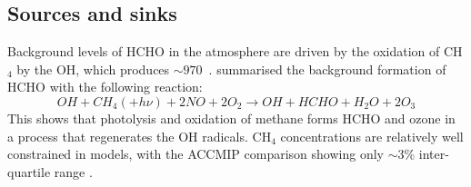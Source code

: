   
  \subsection{Sources and sinks}
    \label{LR:HCHO:Sources}
     
    Background levels of HCHO in the atmosphere are driven by the oxidation of CH$_4$ by the OH$\dot{}$, which produces $\sim 970$\tgpyr ~\parencite{FortemsCheiney2012}.
    \textcite{Atkinson2000} summarised the background formation of HCHO with the following reaction:
    \begin{equation*} \label{LR:HCHO:Sources:eqn_MethaneBackground}
      OH + CH_4 (+ h\nu) + 2NO + 2O_2 \rightarrow OH + HCHO + H_2O + 2O_3
    \end{equation*}
    This shows that photolysis and oxidation of methane forms HCHO and ozone in a process that regenerates the OH radicals.
    CH$_4$ concentrations are relatively well constrained in models, with the ACCMIP comparison showing only $\sim3$\% inter-quartile range \parencite{Young2013}.
    
